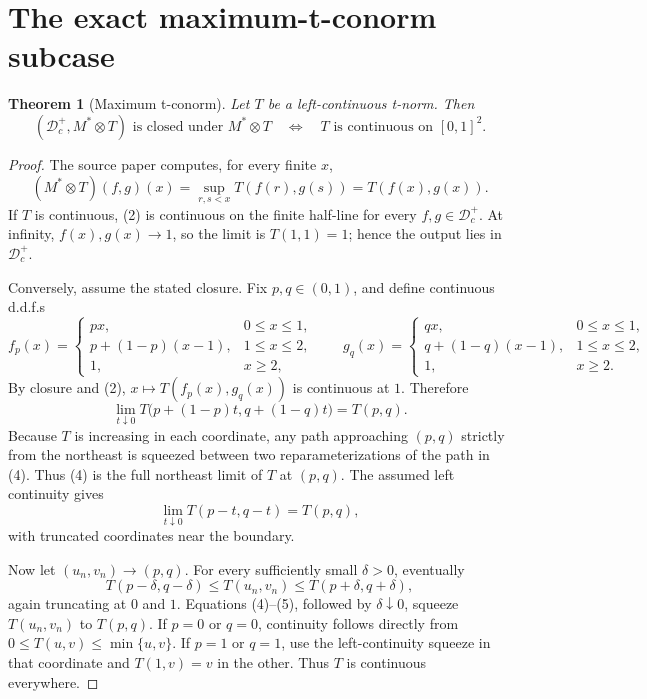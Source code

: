 \documentclass[11pt]{article}
\newtheorem{theorem}{Theorem}
\theoremstyle{remark}
\newcommand{\Dc}{\mathcal D_c^+}
\newcommand{\Lmax}{M^*}
\newcommand{\tens}{\mathbin{\otimes}}
\begin{document}
\section{The exact maximum-t-conorm subcase}

\begin{theorem}[Maximum t-conorm]
\label{thm:max}
Let \(T\) be a left-continuous t-norm.  Then
\[
       (\Dc,\Lmax\tens T)\text{ is closed under }\Lmax\tens T
       \quad\Longleftrightarrow\quad
       T\text{ is continuous on }[0,1]^2.
\]
\end{theorem}

\begin{proof}
The source paper computes, for every finite \(x\),
\[
 (\Lmax\tens T)(f,g)(x)
 =\sup_{r,s<x}T(f(r),g(s))=T(f(x),g(x)).                     \tag{2}
\]
If \(T\) is continuous, (2) is continuous on the finite half-line for every
\(f,g\in\Dc\).  At infinity, \(f(x),g(x)\to1\), so the limit is
\(T(1,1)=1\); hence the output lies in \(\Dc\).

Conversely, assume the stated closure.  Fix \(p,q\in(0,1)\), and define
continuous d.d.f.s
\[
 f_p(x)=
 \begin{cases}
   px,&0\le x\le1,\\
   p+(1-p)(x-1),&1\le x\le2,\\
   1,&x\ge2,
 \end{cases}
 \qquad
 g_q(x)=
 \begin{cases}
   qx,&0\le x\le1,\\
   q+(1-q)(x-1),&1\le x\le2,\\
   1,&x\ge2.
 \end{cases}                                                   \tag{3}
\]
By closure and (2), \(x\mapsto T(f_p(x),g_q(x))\) is continuous at \(1\).
Therefore
\[
 \lim_{t\downarrow0}T\bigl(p+(1-p)t,q+(1-q)t\bigr)=T(p,q).    \tag{4}
\]
Because \(T\) is increasing in each coordinate, any path approaching
\((p,q)\) strictly from the northeast is squeezed between two
reparameterizations of the path in (4).  Thus (4) is the full northeast
limit of \(T\) at \((p,q)\).  The assumed left continuity gives
\[
 \lim_{t\downarrow0}T(p-t,q-t)=T(p,q),                         \tag{5}
\]
with truncated coordinates near the boundary.

Now let \((u_n,v_n)\to(p,q)\).  For every sufficiently small
\(\delta>0\), eventually
\[
 T(p-\delta,q-\delta)
 \le T(u_n,v_n)
 \le T(p+\delta,q+\delta),                                    \tag{6}
\]
again truncating at \(0\) and \(1\).  Equations (4)--(5), followed by
\(\delta\downarrow0\), squeeze \(T(u_n,v_n)\) to \(T(p,q)\).
If \(p=0\) or \(q=0\), continuity follows directly from
\(0\le T(u,v)\le\min\{u,v\}\).  If \(p=1\) or \(q=1\), use the
left-continuity squeeze in that coordinate and \(T(1,v)=v\) in the other.
Thus \(T\) is continuous everywhere.
\end{proof}
\end{document}
